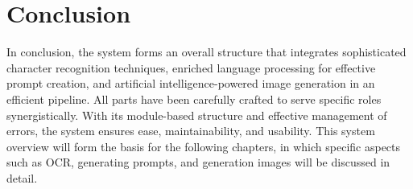 \section{Conclusion}

In conclusion, the system forms an overall structure that integrates sophisticated character recognition techniques, enriched language processing for effective prompt creation, and artificial intelligence-powered image generation in an efficient pipeline. All parts have been carefully crafted to serve specific roles synergistically. With its module-based structure and effective management of errors, the system ensures ease, maintainability, and usability. This system overview will form the basis for the following chapters, in which specific aspects such as OCR, generating prompts, and generation images will be discussed in detail.
